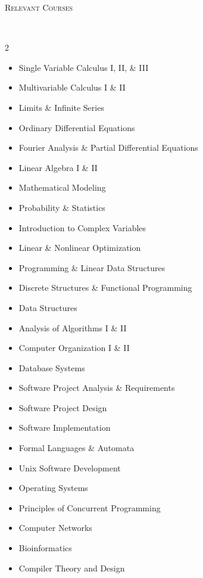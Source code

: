 \documentclass[9pt]{article}
\newenvironment{changemargin}[2]{%
  \begin{list}{}{%
    \setlength{\topsep}{0pt}%
    \setlength{\leftmargin}{#1}%
    \setlength{\rightmargin}{#2}%
    \setlength{\listparindent}{\parindent}%
    \setlength{\itemindent}{\parindent}%
    \setlength{\parsep}{\parskip}%
  }%
  \item[]}{\end{list}
}
\newcommand{\lineover}{
    \begin{changemargin}{-0.05in}{-0.05in}
        \vspace*{-8pt}
        \hrulefill \\
        \vspace*{-2pt}
    \end{changemargin}
}
\newcommand{\header}[1]{
    \begin{changemargin}{-0.5in}{-0.5in}
        \scshape{#1}\\
        \lineover
    \end{changemargin}
}
\newenvironment{body} {
    \vspace*{-16pt}
    \begin{changemargin}{-0.20in}{-0.5in}
  }
    {\end{changemargin}
}
\begin{document}
\header{Relevant Courses}
\begin{body}
    \vspace{4pt}
    \begin{multicols}{2}
        \begin{itemize} \itemsep -0pt
            \item [] Single Variable Calculus I, II, \& III
            \item [] Multivariable Calculus I \& II
            \item [] Limits \& Infinite Series
            \item [] Ordinary Differential Equations
            \item [] Fourier Analysis \& Partial Differential Equations
            \item [] Linear Algebra I \& II
            \item [] Mathematical Modeling
            \item [] Probability \& Statistics
            \item [] Introduction to Complex Variables
            \item [] Linear \& Nonlinear Optimization

            \item [] Programming \& Linear Data Structures
            \item [] Discrete Structures \& Functional Programming
            \item [] Data Structures
            \item [] Analysis of Algorithms I \& II
            \item [] Computer Organization I \& II
            \item [] Database Systems
            \item [] Software Project Analysis \& Requirements
            \item [] Software Project Design
            \item [] Software Implementation
            \item [] Formal Languages \& Automata
            \item [] Unix Software Development
            \item [] Operating Systems
            \item [] Principles of Concurrent Programming
            \item [] Computer Networks
            \item [] Bioinformatics
            \item [] Compiler Theory and Design


\end{itemize}
\end{multicols}
\end{body}
\end{document}
